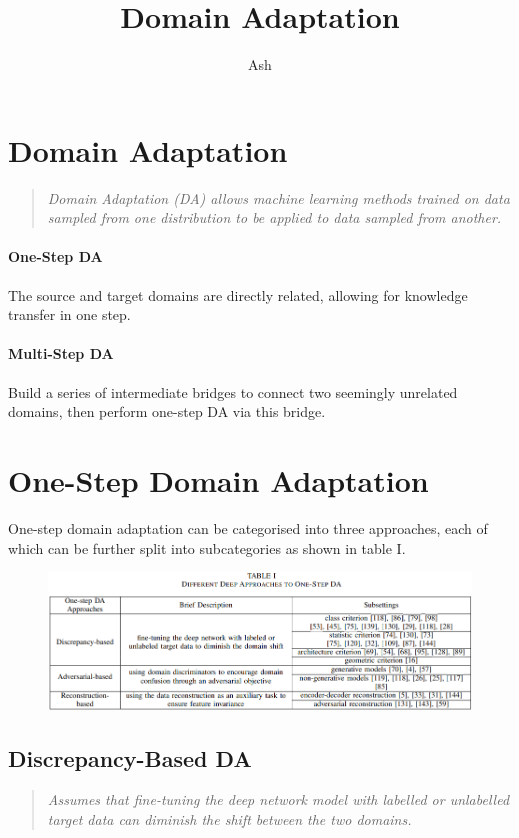 \documentclass{report}
\title{Domain Adaptation}
\author{Ash}
\newcommand{\quoteit}[1]{\begin{quote}\textit{#1}\end{quote}}
\begin{document}
	
\chapter*{Domain Adaptation}

\quoteit{Domain Adaptation (DA) allows machine learning methods trained on data sampled from one distribution to be applied to data sampled from another.}
\vspace{3cm}


\subsubsection*{One-Step DA}
The source and target domains are directly related, allowing for knowledge transfer in one step.

\subsubsection*{Multi-Step DA}
Build a series of intermediate bridges to connect two seemingly unrelated domains, then perform one-step DA via this bridge.



\setcounter{chapter}{1}
\chapter*{One-Step Domain Adaptation}
One-step domain adaptation can be categorised into three approaches, each of which can be further split into subcategories as shown in table I.
\begin{figure}[!h]
	\centering
	\includegraphics[width=17cm]{one-step-approaches}
	\label{fig:one-step-approaches:1}
\end{figure}






\section{Discrepancy-Based DA}
\quoteit{Assumes that fine-tuning the deep network model with labelled or unlabelled target data can diminish the shift between the two domains.}
\end{document}
